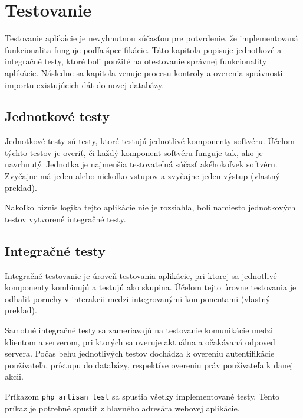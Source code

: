 \chapter{Testovanie}
Testovanie aplikácie je nevyhnutnou súčasťou pre potvrdenie, že implementovaná funkcionalita funguje podľa špecifikácie. Táto kapitola popisuje jednotkové a integračné testy, ktoré boli použité na otestovanie správnej funkcionality aplikácie. Následne sa kapitola venuje procesu kontroly a overenia správnosti importu existujúcich dát do novej databázy.

\section{Jednotkové testy}
Jednotkové testy sú testy, ktoré testujú jednotlivé komponenty softvéru. Účelom týchto testov je overiť, či každý komponent softvéru funguje tak, ako je navrhnutý. Jednotka je najmenšia testovateľná súčasť akéhokoľvek softvéru. Zvyčajne má jeden alebo niekoľko vstupov a zvyčajne jeden výstup \cite{co-je-unit-testing} (vlastný preklad).

Nakoľko biznis logika tejto aplikácie nie je rozsiahla, boli namiesto jednotkových testov vytvorené integračné testy.

\section{Integračné testy}
Integračné testovanie je úroveň testovania aplikácie, pri ktorej sa jednotlivé komponenty kombinujú a testujú ako skupina. Účelom tejto úrovne testovania je odhaliť poruchy v interakcii medzi integrovanými komponentami \cite{co-su-integracne-testy} (vlastný preklad).

Samotné integračné testy sa zameriavajú na testovanie komunikácie medzi klientom a serverom, pri ktorých sa overuje aktuálna a očakávaná odpoveď servera. Počas behu jednotlivých testov dochádza k overeniu autentifikácie používateľa, prístupu do databázy, respektíve overeniu práv používateľa k danej akcii.

\pagebreak

Príkazom \texttt{php artisan test} sa spustia všetky implementované testy. Tento príkaz je potrebné spustiť z hlavného adresára webovej aplikácie.


